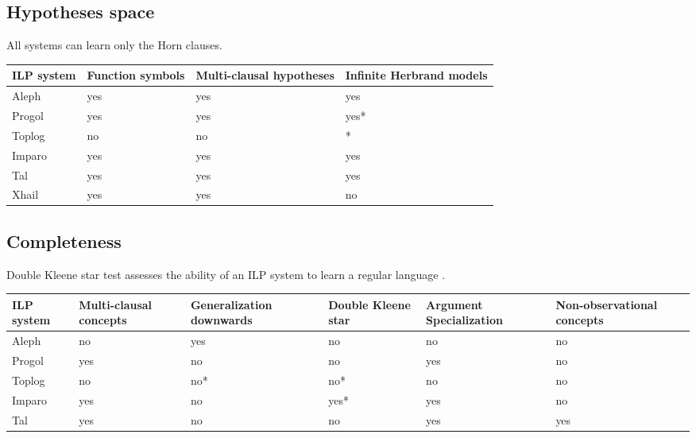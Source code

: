 \subsection{Hypotheses space}
All systems can learn only the Horn clauses.
\begin{center}
    \begin{tabular}{ | l | l | l | p{5cm} |}
    \hline
    ILP system & Function symbols & Multi-clausal hypotheses & Infinite Herbrand models\\ \hline
    Aleph & yes & yes & yes\\ \hline
    Progol & yes & yes & yes*\\ \hline
    Toplog & no & no & *\\ \hline
    Imparo & yes & yes & yes\\ \hline
    Tal & yes & yes & yes\\ \hline
    Xhail & yes & yes & no\\ \hline
    \hline
    \end{tabular}
\end{center}

\subsection{Completeness}
Double Kleene star test assesses the ability of an ILP system to learn a regular language .
\begin{center}
    \begin{tabular}{ | p{2cm} | p{2cm} | p{2cm} | p{2cm} | p{2cm} | p{2cm} |}
    \hline
    ILP system & Multi-clausal concepts & Generalization downwards &
    Double Kleene star & Argument Specialization &
    Non-observational concepts\\ \hline
    Aleph & no & yes & no & no & no\\ \hline
    Progol & yes & no & no & yes & no\\ \hline
    Toplog & no & no* & no* & no & no\\ \hline
    Imparo & yes & no & yes* & yes & no\\ \hline
    Tal & yes & no & no & yes & yes\\ \hline
    \hline
    \end{tabular}
\end{center}

